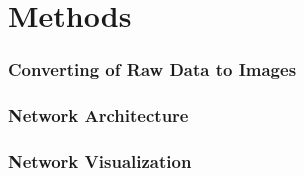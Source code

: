 \part{Methods}


\section{Converting of Raw Data to Images}


\section{Network Architecture}
\section{Network Visualization}